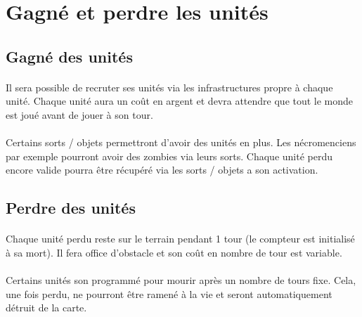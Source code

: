 \section{Gagné et perdre les unités}

\subsection{Gagné des unités}

\paragraph{} Il sera possible de recruter ses unités via les infrastructures propre à chaque unité. Chaque unité aura un coût en argent et devra attendre que tout le monde est joué avant de jouer à son tour.

\paragraph{} Certains sorts / objets permettront d'avoir des unités en plus. Les nécromenciens par exemple pourront avoir des zombies via leurs sorts. Chaque unité perdu encore valide pourra être récupéré via les sorts / objets a son activation.

\subsection{Perdre des unités}

\paragraph{} Chaque unité perdu reste sur le terrain pendant 1 tour (le compteur est initialisé à sa mort). Il fera office d'obstacle et son coût en nombre de tour est variable. 

\paragraph{} Certains unités son programmé pour mourir après un nombre de tours fixe. Cela, une fois perdu, ne pourront être ramené à la vie et seront automatiquement détruit de la carte.
